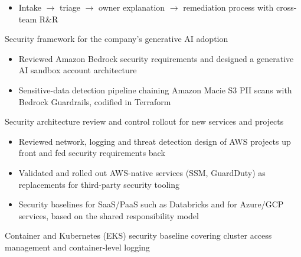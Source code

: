 \begin{cventries}
{\begin{cvitems}
\begin{itemize}
          \item {Intake $\rightarrow$ triage $\rightarrow$ owner explanation $\rightarrow$ remediation process with cross-team R\&R}
        \end{itemize}
        \item {Security framework for the company's generative AI adoption}
        \begin{itemize}
          \item {Reviewed Amazon Bedrock security requirements and designed a generative AI sandbox account architecture}
          \item {Sensitive-data detection pipeline chaining Amazon Macie S3 PII scans with Bedrock Guardrails, codified in Terraform}
        \end{itemize}
        \item {Security architecture review and control rollout for new services and projects}
        \begin{itemize}
          \item {Reviewed network, logging and threat detection design of AWS projects up front and fed security requirements back}
          \item {Validated and rolled out AWS-native services (SSM, GuardDuty) as replacements for third-party security tooling}
          \item {Security baselines for SaaS/PaaS such as Databricks and for Azure/GCP services, based on the shared responsibility model}
        \end{itemize}
        \item {Container and Kubernetes (EKS) security baseline covering cluster access management and container-level logging}
      \end{cvitems}
    }


\end{cventries}
